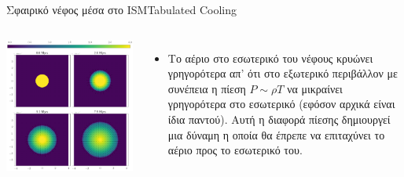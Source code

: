 \documentclass{beamer}
\begin{document}
\begin{frame}{Σφαιρικό νέφος μέσα στο ISM}{Tabulated Cooling}
\begin{columns}
	\begin{center}
		\includegraphics[width=1\linewidth]{../Document/DataImages/TabCoolingRHOquad}
	\end{center}
	\begin{itemize}
		\item{Το αέριο στο εσωτερικό του νέφους κρυώνει γρηγορότερα απ' ότι στο εξωτερικό περιβάλλον με συνέπεια η πίεση $P \sim \rho T$ να μικραίνει γρηγορότερα στο εσωτερικό (εφόσον αρχικά είναι ίδια παντού). Αυτή η διαφορά πίεσης δημιουργεί μια  δύναμη η οποία θα έπρεπε να επιταχύνει το αέριο προς το εσωτερικό του. }
	\end{itemize}
\end{columns}
\end{frame}
\end{document}
